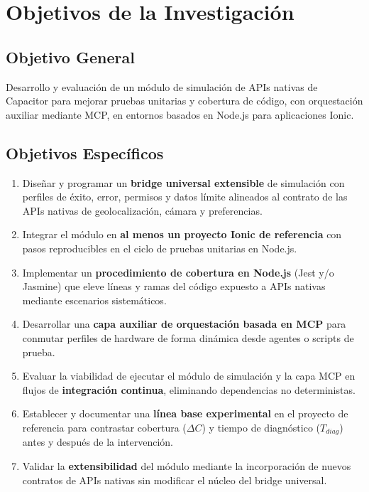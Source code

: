 \section{Objetivos de la Investigación}
\label{chap:objetivos}

\subsection{Objetivo General}
\label{sec:objetivo_general}
Desarrollo y evaluación de un módulo de simulación de APIs nativas de Capacitor para mejorar pruebas unitarias y cobertura de código, con orquestación auxiliar mediante MCP, en entornos basados en Node.js para aplicaciones Ionic.

\subsection{Objetivos Específicos}
\label{sec:objetivos_especificos}

\begin{enumerate}[label=\arabic*., leftmargin=*]
    \item \label{obj:simulador}
    Diseñar y programar un \textbf{bridge universal extensible} de simulación con perfiles de éxito, error, permisos y datos límite alineados al contrato de las APIs nativas de geolocalización, cámara y preferencias.

    \item \label{obj:integracion}
    Integrar el módulo en \textbf{al menos un proyecto Ionic de referencia} con pasos reproducibles en el ciclo de pruebas unitarias en Node.js.

    \item \label{obj:cobertura}
    Implementar un \textbf{procedimiento de cobertura en Node.js} (Jest y/o Jasmine) que eleve líneas y ramas del código expuesto a APIs nativas mediante escenarios sistemáticos.

    \item \label{obj:mcp}
    Desarrollar una \textbf{capa auxiliar de orquestación basada en MCP} para conmutar perfiles de hardware de forma dinámica desde agentes o scripts de prueba.

    \item \label{obj:mcp_valor}
    Evaluar la viabilidad de ejecutar el módulo de simulación y la capa MCP en flujos de \textbf{integración continua}, eliminando dependencias no deterministas.

    \item \label{obj:metricas}
    Establecer y documentar una \textbf{línea base experimental} en el proyecto de referencia para contrastar cobertura ($\Delta C$) y tiempo de diagnóstico ($T_{diag}$) antes y después de la intervención.

    \item \label{obj:transferencia}
    Validar la \textbf{extensibilidad} del módulo mediante la incorporación de nuevos contratos de APIs nativas sin modificar el núcleo del bridge universal.
\end{enumerate}
